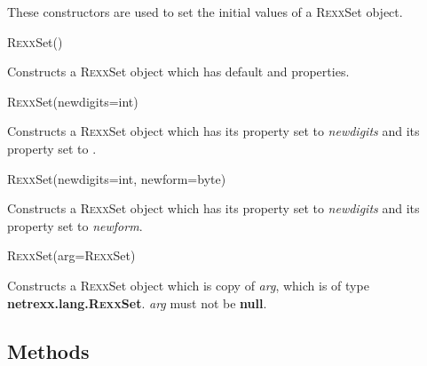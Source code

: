 These constructors are used to set the initial values of a R\textsc{exx}Set
object.
\begin{description}
\item{R\textsc{exx}Set()}

Constructs a R\textsc{exx}Set object which has default  and
 properties.
\item{R\textsc{exx}Set(newdigits=int)}

Constructs a R\textsc{exx}Set object which has its  property set
to \emph{newdigits} and its  property set
to .
\item{R\textsc{exx}Set(newdigits=int, newform=byte)}

Constructs a R\textsc{exx}Set object which has its  property set
to \emph{newdigits} and its  property set to
\emph{newform}.
\item{R\textsc{exx}Set(arg=R\textsc{exx}Set)}

Constructs a R\textsc{exx}Set object which is copy of \emph{arg}, which is of
type \textbf{netrexx.lang.R\textsc{exx}Set}.
\emph{arg} must not be \textbf{null}.
\end{description}


\subsection{Methods}\label{rexxsetmethods}
 
